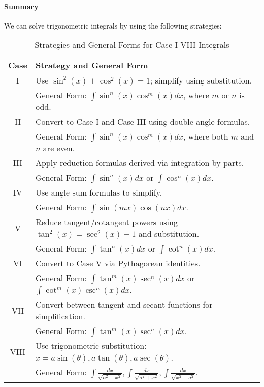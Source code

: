\documentclass[11pt]{report}
\begin{document}
\paragraph{Summary} We can solve trigonometric integrals by using the following strategies:
\begin{table}[h!]
    \centering
    \begin{tabular}{|c|l|}
    \hline
    \textbf{Case} & \textbf{Strategy and General Form} \\ \hline
    I   & Use \(\sin^2(x) + \cos^2(x) = 1\); simplify using substitution. \\
        & General Form: \(\int \sin^n(x) \cos^m(x) dx\), where \(m\) or \(n\) is odd. \\ \hline
    II  & Convert to Case I and Case III using double angle formulas. \\
        & General Form: \(\int \sin^n(x) \cos^m(x) dx\), where both \(m\) and \(n\) are even. \\ \hline
    III & Apply reduction formulas derived via integration by parts. \\
        & General Form: \(\int \sin^n(x) dx\) or \(\int \cos^n(x) dx\). \\ \hline
    IV  & Use angle sum formulas to simplify. \\
        & General Form: \(\int \sin(mx) \cos(nx) dx\). \\ \hline
    V   & Reduce tangent/cotangent powers using \(\tan^2(x) = \sec^2(x) - 1\) and substitution. \\
        & General Form: \(\int \tan^n(x) dx\) or \(\int \cot^n(x) dx\). \\ \hline
    VI  & Convert to Case V via Pythagorean identities. \\
        & General Form: \(\int \tan^m(x) \sec^n(x) dx\) or \(\int \cot^m(x) \csc^n(x) dx\). \\ \hline
    VII & Convert between tangent and secant functions for simplification. \\
        & General Form: \(\int \tan^m(x) \sec^n(x) dx\). \\ \hline
    VIII & Use trigonometric substitution: \(x = a \sin(\theta), a \tan(\theta), a \sec(\theta)\). \\
         & General Form: \(\int \frac{dx}{\sqrt{a^2 - x^2}}, \int \frac{dx}{\sqrt{a^2 + x^2}}, \int \frac{dx}{\sqrt{x^2 - a^2}}\). \\ \hline
    \end{tabular}
    \caption{Strategies and General Forms for Case I-VIII Integrals}
\end{table}
\end{document}
